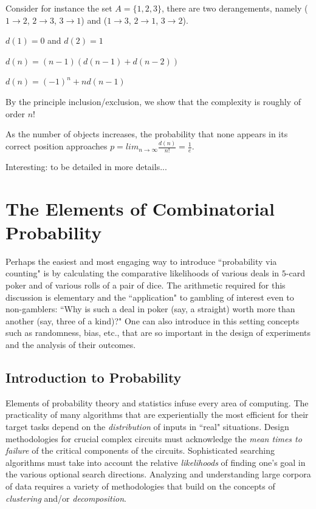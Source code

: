 Consider for instance the set $A = \{1,2,3 \}$, there are two derangements, namely
($1 \rightarrow 2$, $2 \rightarrow 3$, $3 \rightarrow 1$)
and 
($1 \rightarrow 3$, $2 \rightarrow 1$, $3 \rightarrow 2$).
\medskip

$d(1) = 0$ and $d(2) = 1$

$d(n) = (n-1) (d(n-1) + d(n-2))$

$d(n) = (-1)^n + n d(n-1)$
\bigskip

By the principle inclusion/exclusion, we show that the complexity is roughly of order $n!$

As the number of objects increases, the probability that none appears in its correct position approaches
$p=lim_{n \rightarrow \infty}\frac{d(n)}{n!}=\frac{1}{e}$. 

{\Denis Interesting: to be detailed in more details...}









\section{The Elements of Combinatorial Probability}
\label{sec:combinatorial-prob}


Perhaps the easiest and most engaging way to introduce ``probability
via counting" is by calculating the comparative likelihoods of various
deals in $5$-card poker and of various rolls of a pair of dice.  The
arithmetic required for this discussion is elementary and the
``application" to gambling of interest even to non-gamblers: ``Why is
such a deal in poker (say, a straight) worth more than another (say,
three of a kind)?"  One can also introduce in this setting concepts
such as randomness, bias, etc., that are so important in the design of
experiments and the analysis of their outcomes.


\subsection{Introduction to Probability}
\label{sec:prob-stat}


Elements of probability theory and statistics infuse every area of
computing.  The practicality of many algorithms that are
experientially the most efficient for their target tasks depend on the
{\em distribution} of inputs in ``real" situations.  Design
methodologies for crucial complex circuits must acknowledge the {\em
  mean times to failure} of the critical components of the circuits.
Sophisticated searching algorithms must take into account the relative
{\em likelihoods} of finding one's goal in the various optional search
directions.  Analyzing and understanding large corpora of data
requires a variety of methodologies that build on the concepts of {\em
  clustering} and/or {\em decomposition}.

